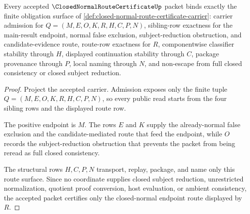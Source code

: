 \begin{theorem}
\label{thm:closed-normal-route-certificate-namecert-obligations}
Every accepted $\ClosedNormalRouteCertificateUp$ packet binds exactly the finite obligation surface of \autoref{def:closed-normal-route-certificate-carrier}: carrier admission for $Q=(M,E,O,K,R,H,C,P,N)$, sibling-row exactness for the main-result endpoint, normal false exclusion, subject-reduction obstruction, and candidate-evidence route, route-row exactness for $R$, componentwise classifier stability through $H$, displayed continuation stability through $C$, package provenance through $P$, local naming through $N$, and non-escape from full closed consistency or closed subject reduction.
\end{theorem}
\begin{proof}
Project the accepted carrier. Admission exposes only the finite tuple $Q=(M,E,O,K,R,H,C,P,N)$, so every public read starts from the four sibling rows and the displayed route row.

The positive endpoint is $M$. The rows $E$ and $K$ supply the already-normal false exclusion and the candidate-mediated route that feed the endpoint, while $O$ records the subject-reduction obstruction that prevents the packet from being reread as full closed consistency.

The structural rows $H,C,P,N$ transport, replay, package, and name only this route surface. Since no coordinate supplies closed subject reduction, unrestricted normalization, quotient proof conversion, host evaluation, or ambient consistency, the accepted packet certifies only the closed-normal endpoint route displayed by $R$.
\end{proof}

